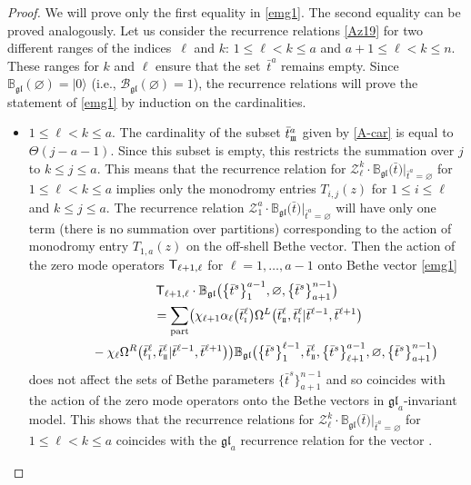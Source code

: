 \documentclass[pdftex]{sigma}
\newcommand{\so}{\scriptscriptstyle \rm I}
\newcommand{\st}{\scriptscriptstyle \rm I\hspace{-1pt}I}
\newcommand{\sth}{\scriptscriptstyle \rm I\hspace{-1pt}I\hspace{-1pt}I}
\newcommand{\bt}{{\bar t}}
\theoremstyle{definition}
\def\r#1{\eqref{#1}}
\def\sT{{\sf T}}
\def\rvec{|0\rangle}
\def\BBg{\mathbb{B}_{\mathfrak{gl}}}
\def\cBg{\mathcal{B}_{\mathfrak{gl}}}
\def\vk{\chi}
\def\Z{\mathcal{Z}}
\def\Oml{\Omega^L}
\def\Omr{\Omega^R}
\begin{document}
\begin{proof}
We will prove only the first equality in \r{emg1}. The second equality can be proved analogously.
Let us consider the recurrence
relations \r{Az19} for two different ranges of the indices~$\ell$ and $k$:
$1\leq \ell<k\leq a$ and $a+1\leq \ell<k\leq n$.
These ranges for $k$ and $\ell$ ensure that the set~$\bt^a$ remains empty.
Since $\BBg(\varnothing)=\rvec$ (i.e., $\cBg(\varnothing)=1$), the recurrence relations will prove the statement of \eqref{emg1} by induction on the cardinalities.
\begin{itemize}\itemsep=0pt
\item $1\leq \ell<k\leq a$.
The cardinality of the subset $\bt^a_{\sth}$ given by \r{A-car}
is equal to $\Theta(j-a-1)$. Since
this subset is empty, this restricts the summation
over $j$ to $k\leq j\leq a$. This means that the recurrence relation
for $\Z^k_\ell\cdot
\BBg\bigl(\bt\bigr)|_{\bt^a=\varnothing}$ for $1\leq \ell<k\leq a$
implies only the monodromy entries $T_{i,j}(z)$ for $1\leq i\leq \ell$ and
$k\leq j\leq a$. The recurrence relation $\Z^a_{1}\cdot
\BBg\bigl(\bt\bigr)|_{\bt^a=\varnothing}$ will have only one term (there is no summation over
partitions) corresponding to the action of
monodromy entry $T_{1,a}(z)$ on the off-shell Bethe vector.
Then the action of the zero mode operators $\sT_{\ell+1,\ell}$ for
$\ell=1,\dots,a-1$ onto Bethe vector \r{emg1}
\begin{gather*}
\sT_{\ell+1,\ell}\cdot\BBg\bigl(\bigl\{\bt^s\bigr\}_1^{a-1},\varnothing,\bigl\{\bt^s\bigr\}_{a+1}^{n-1}\bigr)\\
\qquad=
\sum_{\rm part}\bigl(\vk_{\ell+1} \alpha_\ell\bigl(\bt^\ell_{\so}\bigr)
\Oml\bigl(\bt^\ell_{\st},\bt^\ell_{\so}|\bt^{\ell-1},\bt^{\ell+1}\bigr)\\
\phantom{\qquad=}{}-\vk_\ell \Omr\bigl(\bt^\ell_{\so},\bt^\ell_{\st}|\bt^{\ell-1},\bt^{\ell+1}\bigr)\bigr)
\BBg\bigl(\bigl\{\bt^s\bigr\}_1^{\ell-1},\bt^\ell_{\st},\bigl\{\bt^s\bigr\}_{\ell+1}^{a-1},
\varnothing,\bigl\{\bt^s\bigr\}_{a+1}^{n-1}\bigr)
\end{gather*}
does not affect the sets of Bethe parameters $\bigl\{\bt^s\bigr\}_{a+1}^{n-1}$
and so coincides with the action of the zero mode operators
onto the Bethe vectors in $\mathfrak{gl}_{a}$-invariant model.
This shows that the recurrence relations for $\Z^k_\ell\cdot
\BBg\bigl(\bt\bigr)|_{\bt^a=\varnothing}$ for $1\leq \ell< k\leq a$
 coincides with the $\mathfrak{gl}_{a}$ recurrence relation for the vector
\smash{$\BBg\bigl(\bigl\{\bt\bigr\}\raisebox{-1pt}{${\vphantom{\big|}}_1^{a-1}$}\bigr)$}.


\end{itemize}
\end{proof}
\end{document}

